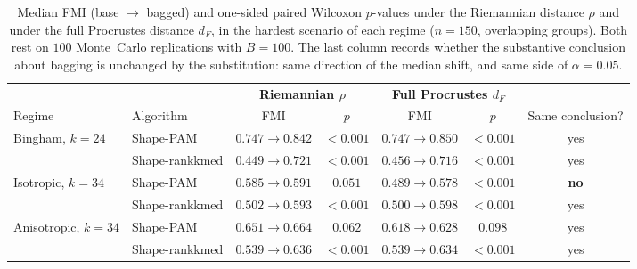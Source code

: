 \documentclass[11pt,a4paper]{article}
\begin{document}
\begin{table}[h]
\centering
\caption{Median FMI (base $\to$ bagged) and one-sided paired Wilcoxon $p$-values
  under the Riemannian distance $\rho$ and under the full Procrustes distance
  $d_F$, in the hardest scenario of each regime ($n=150$, overlapping groups).
  Both rest on $100$ Monte~Carlo replications with $B=100$. The last column
  records whether the substantive conclusion about bagging is unchanged by the
  substitution: same direction of the median shift, and same side of
  $\alpha=0.05$.}
\label{tab:dF-vs-rho}
\small
\begin{tabular}{llccccc}
\toprule
& & \multicolumn{2}{c}{\textbf{Riemannian $\rho$}}
  & \multicolumn{2}{c}{\textbf{Full Procrustes $d_F$}} & \\
\cmidrule(lr){3-4}\cmidrule(lr){5-6}
Regime & Algorithm & FMI & $p$ & FMI & $p$ & Same conclusion? \\
\midrule
\multirow{2}{*}{Bingham, $k=24$}
 & Shape-PAM      & $0.747\to0.842$ & $<\!0.001$ & $0.747\to0.850$ & $<\!0.001$ & yes \\
 & Shape-rankkmed & $0.449\to0.721$ & $<\!0.001$ & $0.456\to0.716$ & $<\!0.001$ & yes \\
\midrule
\multirow{2}{*}{Isotropic, $k=34$}
 & Shape-PAM      & $0.585\to0.591$ & $0.051$    & $0.489\to0.578$ & $<\!0.001$ & \textbf{no} \\
 & Shape-rankkmed & $0.502\to0.593$ & $<\!0.001$ & $0.500\to0.598$ & $<\!0.001$ & yes \\
\midrule
\multirow{2}{*}{Anisotropic, $k=34$}
 & Shape-PAM      & $0.651\to0.664$ & $0.062$    & $0.618\to0.628$ & $0.098$    & yes \\
 & Shape-rankkmed & $0.539\to0.636$ & $<\!0.001$ & $0.539\to0.634$ & $<\!0.001$ & yes \\
\bottomrule
\end{tabular}
\end{table}



\end{document}
